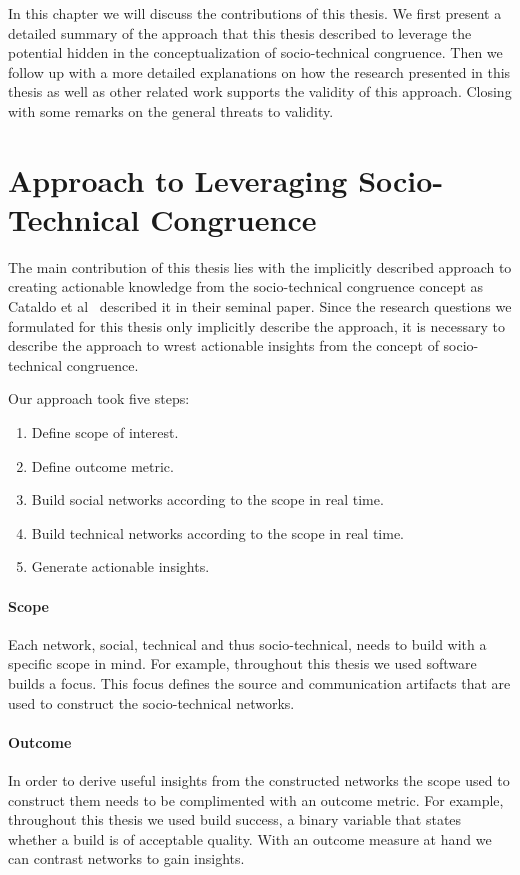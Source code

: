 In this chapter we will discuss the contributions of this thesis.
We first present a detailed summary of the approach that this thesis described to leverage the potential hidden in the conceptualization of socio-technical congruence.
Then we follow up with a more detailed explanations on how the research presented in this thesis as well as other related work supports the validity of this approach.
Closing with some remarks on the general threats to validity.

\section{Approach to Leveraging Socio-Technical Congruence}
The main contribution of this thesis lies with the implicitly described approach to creating actionable knowledge from the socio-technical congruence concept as Cataldo et al~\cite{cataldo:cscw:2006} described it in their seminal paper.
Since the research questions we formulated for this thesis only implicitly describe the approach, it is necessary to describe the approach to wrest actionable insights from the concept of socio-technical congruence.

Our approach took five steps:
\begin{enumerate}
\item Define scope of interest.
\item Define outcome metric.
\item Build social networks according to the scope in real time.
\item Build technical networks according to the scope in real time.
\item Generate actionable insights.
\end{enumerate}

\paragraph{Scope} 
Each network, social, technical and thus socio-technical, needs to build with a specific scope in mind.
For example, throughout this thesis we used software builds a focus.
This focus defines the source and communication artifacts that are used to construct the socio-technical networks. 

\paragraph{Outcome}
In order to derive useful insights from the constructed networks the scope used to construct them needs to be complimented with an outcome metric.
For example, throughout this thesis we used build success, a binary variable that states whether a build is of acceptable quality.
With an outcome measure at hand we can contrast networks to gain insights.


